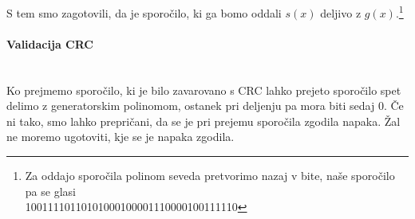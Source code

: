 \documentclass[12pt]{article}
\begin{document}
            S tem smo zagotovili, da je sporočilo, ki ga bomo oddali $s(x)$ 
            deljivo z $g(x)$.\footnote{Za oddajo sporočila polinom seveda pretvorimo 
            nazaj v bite, naše sporočilo pa se glasi\\ 
            10011110110101000100001110000100111110}
            
            \paragraph{Validacija CRC} \mbox{}\\
            Ko prejmemo sporočilo, ki je bilo zavarovano s CRC lahko prejeto 
            sporočilo spet delimo z generatorskim polinomom, ostanek pri 
            deljenju pa mora biti sedaj 0. Če ni tako, smo lahko prepričani,
            da se je pri prejemu sporočila zgodila napaka. Žal ne moremo 
            ugotoviti, kje se je napaka zgodila.

\newpage
\end{document}
